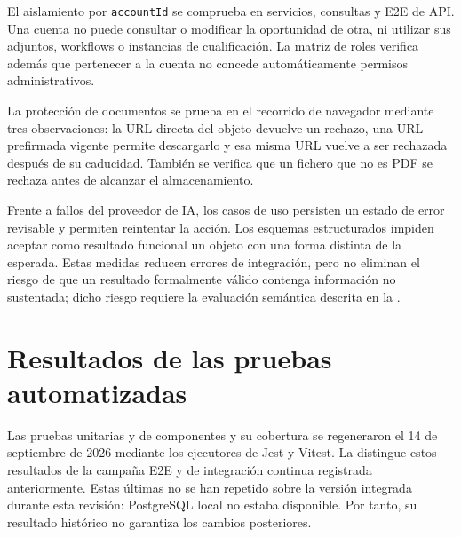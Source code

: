 El aislamiento por \texttt{accountId} se comprueba en servicios, consultas y
E2E de API. Una cuenta no puede consultar o modificar la oportunidad de otra,
ni utilizar sus adjuntos, workflows o instancias de cualificación. La matriz de
roles verifica además que pertenecer a la cuenta no concede automáticamente
permisos administrativos.

La protección de documentos se prueba en el recorrido de navegador mediante
tres observaciones: la URL directa del objeto devuelve un rechazo, una URL
prefirmada vigente permite descargarlo y esa misma URL vuelve a ser rechazada
después de su caducidad. También se verifica que un fichero que no es PDF se
rechaza antes de alcanzar el almacenamiento.

Frente a fallos del proveedor de IA, los casos de uso persisten un estado de
error revisable y permiten reintentar la acción. Los esquemas estructurados
impiden aceptar como resultado funcional un objeto con una forma distinta de
la esperada. Estas medidas reducen errores de integración, pero no eliminan el
riesgo de que un resultado formalmente válido contenga información no
sustentada; dicho riesgo requiere la evaluación semántica descrita en la
 \cite{autio2024}.

\section{Resultados de las pruebas automatizadas}
\label{sec:automated-test-results}

Las pruebas unitarias y de componentes y su cobertura se regeneraron el 14 de
septiembre de 2026 mediante los ejecutores de Jest y Vitest. La
 distingue estos resultados de la campaña
E2E y de integración continua registrada anteriormente. Estas últimas no se
han repetido sobre la versión integrada durante esta revisión: PostgreSQL
local no estaba disponible. Por tanto, su resultado histórico no garantiza
los cambios posteriores.

